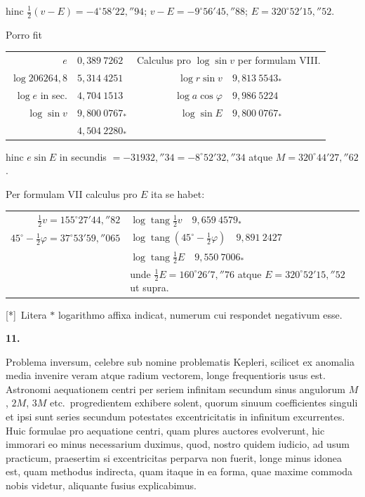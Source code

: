 \documentclass[12pt,a4paper]{book}
\newcommand{\tang}{\operatorname{tang}}
\begin{document}
hinc $\tfrac{1}{2}(v-E)=-4^{\circ}58'22{,}''94$; $v-E=-9^{\circ}56'45{,}''88$; $E=320^{\circ}52'15{,}''52$.

Porro fit

\begin{center}
\begin{tabular}{@{}r@{\quad}l@{\quad}|@{\quad}r@{\quad}l@{}}
$e$ & $0{,}389\ 7262$ & \multicolumn{2}{l}{Calculus pro $\log\sin v$ per formulam VIII.} \\
$\log 206264{,}8$ & $5{,}314\ 4251$ & $\log r\sin v$ & $9{,}813\ 5543_{*}$ \\
$\log e$ in sec. & $4{,}704\ 1513$ & $\log a\cos\varphi$ & $9{,}986\ 5224$ \\
$\log\sin v$ & $9{,}800\ 0767_{*}$ & $\log\sin E$ & $9{,}800\ 0767_{*}$ \\
& $4{,}504\ 2280_{*}$ & &
\end{tabular}
\end{center}

hinc $e\sin E$ in secundis $=-31932{,}''34=-8^{\circ}52'32{,}''34$ atque $M=320^{\circ}44'27{,}''62$.

Per formulam VII calculus pro $E$ ita se habet:

\begin{center}
\begin{tabular}{@{}r@{\quad}l@{}}
$\tfrac{1}{2}v=155^{\circ}27'44{,}''82$ & $\log\tang\tfrac{1}{2}v \quad 9{,}659\ 4579_{*}$ \\
$45^{\circ}-\tfrac{1}{2}\varphi=37^{\circ}53'59{,}''065$ & $\log\tang(45^{\circ}-\tfrac{1}{2}\varphi) \quad 9{,}891\ 2427$ \\
& $\log\tang\tfrac{1}{2}E \quad 9{,}550\ 7006_{*}$ \\
& unde $\tfrac{1}{2}E=160^{\circ}26'7{,}''76$ atque $E=320^{\circ}52'15{,}''52$ ut supra.
\end{tabular}
\end{center}

[*]\ Litera $*$ logarithmo affixa indicat, numerum cui respondet negativum esse.

\textbf{11.}

Problema inversum, celebre sub nomine problematis Kepleri, scilicet ex anomalia media invenire veram atque radium vectorem, longe frequentioris usus est. Astronomi aequationem centri per seriem infinitam secundum sinus angulorum $M$, $2M$, $3M$ etc.~progredientem exhibere solent, quorum sinuum coefficientes singuli et ipsi sunt series secundum potestates excentricitatis in infinitum excurrentes. Huic formulae pro aequatione centri, quam plures auctores evolverunt, hic immorari eo minus necessarium duximus, quod, nostro quidem iudicio, ad usum practicum, praesertim si excentricitas perparva non fuerit, longe minus idonea est, quam methodus indirecta, quam itaque in ea forma, quae maxime commoda nobis videtur, aliquante fusius explicabimus.
\end{document}
